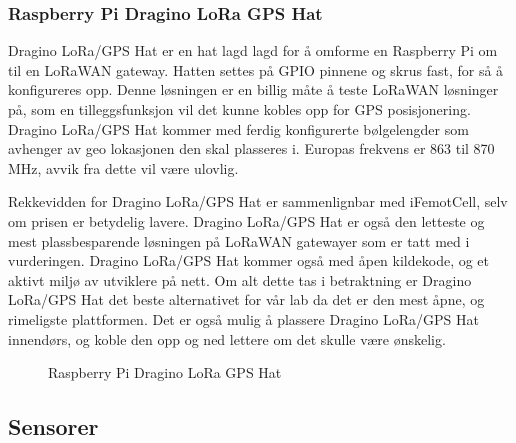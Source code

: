 \documentclass{article}
\begin{document}
\subsubsection{Raspberry Pi Dragino LoRa GPS Hat}
Dragino LoRa/GPS Hat er en hat lagd lagd for å omforme en Raspberry Pi om til en LoRaWAN gateway. Hatten settes på GPIO pinnene og skrus fast, for så å konfigureres opp. Denne løsningen er en billig måte å teste LoRaWAN løsninger på, som en tilleggsfunksjon vil det kunne kobles opp for GPS posisjonering. Dragino LoRa/GPS Hat kommer med ferdig konfigurerte bølgelengder som avhenger av geo lokasjonen den skal plasseres i. Europas frekvens er 863 til 870 MHz, avvik fra dette vil være ulovlig. 

Rekkevidden for Dragino LoRa/GPS Hat er sammenlignbar med iFemotCell, selv om prisen er betydelig lavere. Dragino LoRa/GPS Hat er også den letteste og mest plassbesparende løsningen på LoRaWAN gatewayer som er tatt med i vurderingen. Dragino LoRa/GPS Hat kommer også med åpen kildekode, og et aktivt miljø av utviklere på nett. Om alt dette tas i betraktning er Dragino LoRa/GPS Hat det beste alternativet for vår lab da det er den mest åpne, og rimeligste plattformen. Det er også mulig å plassere Dragino LoRa/GPS Hat innendørs, og koble den opp og ned lettere om det skulle være ønskelig.

\begin{figure}
  \centering
  \caption{Raspberry Pi Dragino LoRa GPS Hat}
\end{figure}

\subsection{Sensorer}
\end{document}
